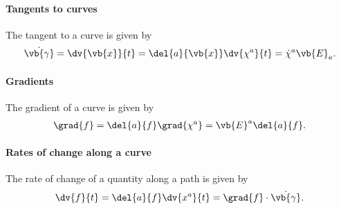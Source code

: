 \paragraph{Tangents to curves}
The tangent to a curve is given by
\begin{align*}
	\dot{\vb{\gamma}} = \dv{\vb{x}}{t} = \del{a}{\vb{x}}\dv{\chi^{a}}{t} = \dot{\chi}^{a}\vb{E}_{a}.
\end{align*}

\paragraph{Gradients}
The gradient of a curve is given by
\begin{align*}
	\grad{f} = \del{a}{f}\grad{\chi^{a}} = \vb{E}^{a}\del{a}{f}.
\end{align*}

\paragraph{Rates of change along a curve}
The rate of change of a quantity along a path is given by
\begin{align*}
	\dv{f}{t} = \del{a}{f}\dv{x^{a}}{t} = \grad{f}\cdot\dot{\vb{\gamma}}.
\end{align*}